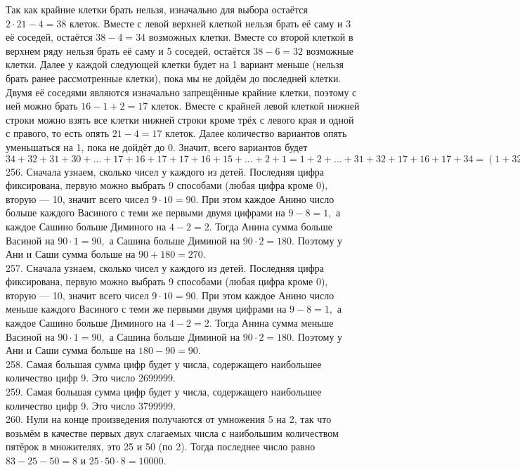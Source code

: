 Так как крайние клетки брать нельзя, изначально для выбора остаётся $2\cdot21-4=38$ клеток. Вместе с левой верхней клеткой нельзя брать её саму и 3 её соседей, остаётся $38-4=34$ возможных клетки. Вместе со второй клеткой в верхнем ряду нельзя брать её саму и 5 соседей, остаётся $38-6=32$ возможные клетки. Далее у каждой следующей клетки будет на 1 вариант меньше (нельзя брать ранее рассмотренные клетки), пока мы не дойдём до последней клетки. Двумя её соседями являются изначально запрещённые крайние клетки, поэтому с ней можно брать $16-1+2=17$ клеток. Вместе с крайней левой клеткой нижней строки можно взять все клетки нижней строки кроме трёх с левого края и одной с правого, то есть опять $21-4=17$ клеток. Далее количество вариантов опять уменьшаться на 1, пока не дойдёт до 0. Значит, всего вариантов будет $34+32+31+30+\ldots+17+16+17+17+16+15+\ldots+2+1=1+2+\ldots+31+32+17+16+17+34=(1+32)+(2+21)+\ldots+(16+17)+84=33\cdot16+84=612.$\\
256. Сначала узнаем, сколько чисел у каждого из детей. Последняя цифра фиксирована, первую можно выбрать 9 способами (любая цифра кроме 0), вторую --- 10, значит всего чисел $9\cdot10=90.$ При этом каждое Анино число больше каждого Васиного с теми же первыми двумя цифрами на $9-8=1,$ а каждое Сашино больше Диминого на $4-2=2.$ Тогда Анина сумма больше Васиной на $90\cdot1=90,$ а Сашина больше Диминой на $90\cdot2=180.$ Поэтому у Ани и Саши сумма больше на $90+180=270.$\\
257. Сначала узнаем, сколько чисел у каждого из детей. Последняя цифра фиксирована, первую можно выбрать 9 способами (любая цифра кроме 0), вторую --- 10, значит всего чисел $9\cdot10=90.$ При этом каждое Анино число меньше каждого Васиного с теми же первыми двумя цифрами на $9-8=1,$ а каждое Сашино больше Диминого на $4-2=2.$ Тогда Анина сумма меньше Васиной на $90\cdot1=90,$ а Сашина больше Диминой на $90\cdot2=180.$ Поэтому у Ани и Саши сумма больше на $180-90=90.$\\
258. Самая большая сумма цифр будет у числа, содержащего наибольшее количество цифр 9. Это число 2699999.\\
259. Самая большая сумма цифр будет у числа, содержащего наибольшее количество цифр 9. Это число 3799999.\\
260. Нули на конце произведения получаются от умножения 5 на 2, так что возьмём в качестве первых двух слагаемых числа с наибольшим количеством пятёрок в множителях, это 25 и 50 (по 2). Тогда последнее число равно $83-25-50=8$ и $25\cdot50\cdot8=10000.$\\
